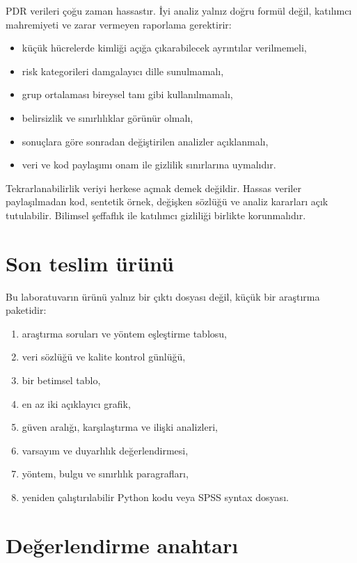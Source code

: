 PDR verileri çoğu zaman hassastır. İyi analiz yalnız doğru formül değil,
katılımcı mahremiyeti ve zarar vermeyen raporlama gerektirir:

\begin{itemize}
  \item küçük hücrelerde kimliği açığa çıkarabilecek ayrıntılar verilmemeli,
  \item risk kategorileri damgalayıcı dille sunulmamalı,
  \item grup ortalaması bireysel tanı gibi kullanılmamalı,
  \item belirsizlik ve sınırlılıklar görünür olmalı,
  \item sonuçlara göre sonradan değiştirilen analizler açıklanmalı,
  \item veri ve kod paylaşımı onam ile gizlilik sınırlarına uymalıdır.
\end{itemize}

\begin{researchbox}
Tekrarlanabilirlik veriyi herkese açmak demek değildir. Hassas veriler
paylaşılmadan kod, sentetik örnek, değişken sözlüğü ve analiz kararları açık
tutulabilir. Bilimsel şeffaflık ile katılımcı gizliliği birlikte korunmalıdır.
\end{researchbox}

\section{Son teslim ürünü}

Bu laboratuvarın ürünü yalnız bir çıktı dosyası değil, küçük bir araştırma
paketidir:

\begin{enumerate}
  \item araştırma soruları ve yöntem eşleştirme tablosu,
  \item veri sözlüğü ve kalite kontrol günlüğü,
  \item bir betimsel tablo,
  \item en az iki açıklayıcı grafik,
  \item güven aralığı, karşılaştırma ve ilişki analizleri,
  \item varsayım ve duyarlılık değerlendirmesi,
  \item yöntem, bulgu ve sınırlılık paragrafları,
  \item yeniden çalıştırılabilir Python kodu veya SPSS syntax dosyası.
\end{enumerate}

\section{Değerlendirme anahtarı}

